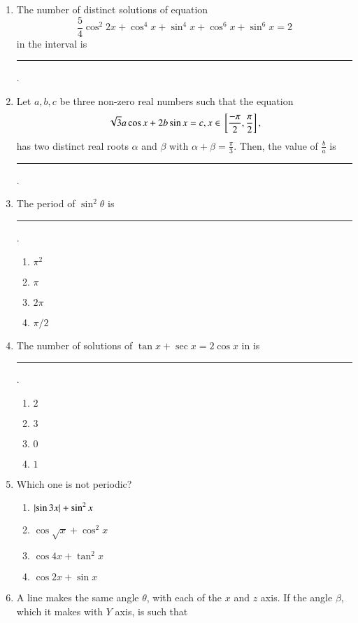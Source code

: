 \begin{enumerate}[label=\thesubsection.\arabic*,ref=\thesubsection.\theenumi]
        \hfill{}
%
\item The number of distinct solutions of equation
$$\frac{5}{4}\cos^2 2x+\cos^4 x+\sin^4 x+\cos^6 x+\sin^6 x=2$$
in the interval   is \rule{1cm}{0.1pt}.\hfill{} 
\item Let $a, b, c$ be three non-zero real numbers such
that the equation
%
$$\sqrt{3} a\cos x+2b\sin x = c,x\in {}\left[\frac{-\pi}{2},\frac{\pi}{2}\right],$$
 has two distinct real roots $\alpha$ and $\beta$ with $\alpha+\beta=\frac{\pi}{3}$. Then, the value of $\frac{b}{a}$  is \rule{1cm}{0.1pt}.
\hfill{}
\item The period of $\sin^2 \theta$  is \rule{1cm}{0.1pt}.\hfill{} 
\begin{multicols}{4}
\begin{enumerate}
\item $\pi^2$
\columnbreak
\item $\pi$
\columnbreak
\item $2\pi$
\columnbreak
\item $\pi/2$
\end{enumerate}
\end{multicols}
\item The number of solutions of $\tan x + \sec x=2\cos x$ in   is \rule{1cm}{0.1pt}.\hfill{} 
\begin{multicols}{4}
\begin{enumerate}
\item $2$
\columnbreak
\item $3$
\columnbreak
\item $0$
\columnbreak
\item $1$
\end{enumerate}
\end{multicols}
\item Which one is not periodic? \hfill{}
\begin{multicols}{4} 
\begin{enumerate}
\item $\left\vert\sin3x\right\vert+\sin^2 x$
\item $\cos\sqrt{x}+\cos^2 x$
\columnbreak
\item $\cos4x+\tan^2 x$
\item $\cos2x+\sin x$
\end{enumerate}
\end{multicols}
\item A line makes the same angle $\theta$, with each of the $x$ and $z$ axis. 
If the angle $\beta$, which it makes with $Y$ axis, is such that

\end{enumerate}

